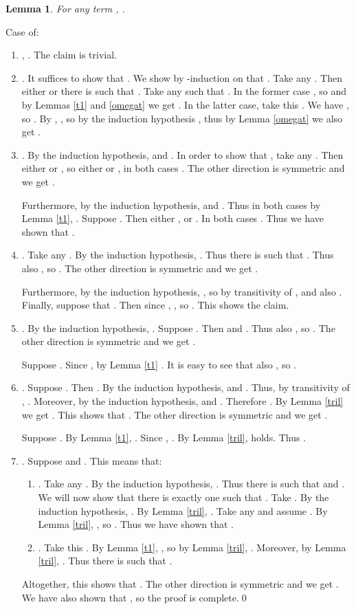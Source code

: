 \documentclass{LMCS}
\newtheorem{lemma}[thm]{Lemma}
\begin{document}
\begin{lemma}\label{trieq}
For any term , .
\end{lemma}
\proof Case  of:
\begin{enumerate}[]
\item , . The claim is trivial.
\item . It suffices to show that . We show by
-induction on  that . Take any . 
Then either  or there is  such that . Take
any  such that . In the former case , so  and by Lemmas
\ref{t1} and \ref{omegat} we get . In the latter case, take this . We have ,
so . By , , so by the induction hypothesis
, thus by Lemma \ref{omegat} we also get . 
\item . By the induction hypothesis, 
 and .
In order to show that , take any . Then
either  or , so either
 or , in both cases . The other direction is symmetric and
we get . 

Furthermore, by the induction hypothesis,  and
. Thus in both cases by Lemma \ref{t1}, . Suppose .
Then either , or . In both cases . Thus
we have shown that . 
\item . Take any . By the induction hypothesis, . Thus there is  such that
. Thus also , so . The other direction is symmetric and we get 
. 

Furthermore, by the induction hypothesis, , 
so by transitivity of ,  and also . Finally, 
suppose that . Then since , , so . This shows the claim. 
\item . By the induction hypothesis, . Suppose . Then  and . Thus also , so . The other direction is symmetric and we get . 

Suppose . Since , by Lemma \ref{t1} . 
It is easy to see that also , so .
\item . Suppose . Then
.
By the induction hypothesis,  and
. Thus, by transitivity of , .
Moreover, by the induction hypothesis,  and
. Therefore . By Lemma \ref{tril} we get . This shows
that . The
other direction is symmetric and we get . 

Suppose . By Lemma \ref{t1}, . Since , . By
Lemma \ref{tril},  holds. Thus . 
\item . Suppose  and . This means that:
\begin{enumerate}[]
\item .
Take any . By the induction hypothesis, . Thus there is  such that  and . We will now show that there is exactly one 
such that . Take . 
By the induction hypothesis, . 
By Lemma \ref{tril}, .
Take any  and assume . By Lemma
\ref{tril}, , so . Thus we have
shown that . 
\item . Take this .
By Lemma \ref{t1}, , so by Lemma \ref{tril}, .  
Moreover, by Lemma \ref{tril}, . 
Thus there is  such that .
\end{enumerate}
Altogether, this shows that . The other direction is symmetric and we get
. We have
also shown that , so the proof is complete.\qed
\end{enumerate}
\end{document}
